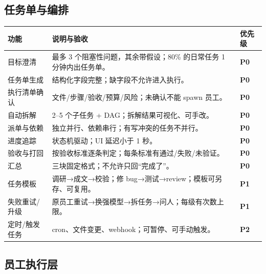 \documentclass[UTF8,11pt,a4paper,fontset=windows]{ctexart}
\let\ocsubsection\subsection
\renewcommand{\subsection}{\Needspace{5\baselineskip}\ocsubsection}
\newcommand{\pzero}{\textcolor{accent}{\textbf{P0}}}
\newcommand{\pone}{\textcolor{primary}{\textbf{P1}}}
\newcommand{\ptwo}{\textcolor{muted}{\textbf{P2}}}
\begin{document}
\subsection{任务单与编排}

\noindent\begin{minipage}{\linewidth}
\centering
{}
\small
\begin{tabularx}{\linewidth}{@{}p{2.6cm} X p{1.6cm}@{}}
\toprule
\textbf{功能} & \textbf{说明与验收} & \textbf{优先级} \\
\midrule
目标澄清 & 最多 3 个阻塞性问题，其余带假设；80\% 的日常任务 1 分钟内出任务单。 & \pzero \\
任务单生成 & 结构化字段完整；缺字段不允许进入执行。 & \pzero \\
执行清单确认 & 文件/步骤/验收/预算/风险；未确认不能 spawn 员工。 & \pzero \\
自动拆解 & 2--5 个子任务 + DAG；拆解结果可视化、可手改。 & \pzero \\
派单与依赖 & 独立并行、依赖串行；有写冲突的任务不并行。 & \pzero \\
进度追踪 & 状态机驱动；UI 延迟小于 1 秒。 & \pzero \\
验收与打回 & 按验收标准逐条判定；每条标准有通过/失败/未验证。 & \pzero \\
汇总 & 三块固定格式；不允许只回“完成了”。 & \pzero \\
任务模板 & 调研→成文→校验；修 bug→测试→review；模板可另存、可复用。 & \pone \\
失败重试/升级 & 原员工重试→换强模型→拆任务→问人；每级有次数上限。 & \pone \\
定时/触发任务 & cron、文件变更、webhook；可暂停、可手动触发。 & \ptwo \\
\bottomrule
\end{tabularx}
\end{minipage}

\subsection{员工执行层}
\end{document}
